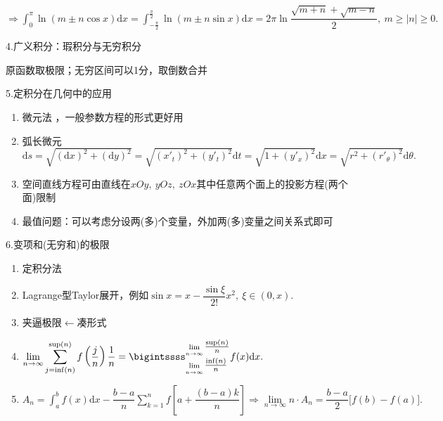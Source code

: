 \documentclass[UTF8]{ctexart}
\numberwithin{equation}{section}
\numberwithin{figure}{section}
\numberwithin{table}{section}
\newcommand\dif{\mathrm{d}}
\newcommand\no{\noindent}
\newcommand\dis{\displaystyle}
\newcommand\gs{\geqslant}
\newcommand\limn{\dis\lim\limits_{n\to\infty}}
\newcommand\intd{\dis\int}
\newcommand\intab{\dis\int_a^b}
\begin{document}
\begin{spacing}{2}
\begin{enumerate}[itemindent=1.4em, label=(\arabic*)]
\textcolor[rgb]{1,0,0}{$\Longrightarrow\intd_0^\pi\ln(m\pm n\cos x)\dif x
=\intd_{-\tfrac{\pi}{2}}^{\tfrac{\pi}{2}}\ln(m\pm n\sin x)\dif x
=2\pi\ln\dfrac{\sqrt{m+n}+\sqrt{m-n}}{2},\ m\gs |n|\gs 0.$}

\end{enumerate}

\no4.广义积分：瑕积分与无穷积分

原函数取极限；无穷区间可以1分，取倒数合并

\no5.定积分在几何中的应用

\begin{enumerate}[itemindent=1.4em, label=(\arabic*)]

\item  微元法 ，一般参数方程的形式更好用

\item 弧长微元$\dis\dif s=\sqrt{(\dif x)^2+(\dif y)^2}=\sqrt{(x'_t)^2+(y'_t)^2}\dif t
=\sqrt{1+(y'_x)^2}\dif x=\sqrt{r^2+(r'_\theta)^2}\dif \theta.$

\item 空间直线方程可由直线在$xOy,\ yOz,\ zOx$其中任意两个面上的投影方程(两个面)限制

\item 最值问题：可以考虑分设两(多)个变量，外加两(多)变量之间关系式即可

\end{enumerate}

\no6.变项和(无穷和)的极限

\begin{enumerate}[itemindent=1.4em, label=(\arabic*)]

\item 定积分法

\item Lagrange型Taylor展开，例如$\sin x=x-\dfrac{\sin\xi}{2!}x^2,\ \xi\in(0,x).$

\item 夹逼极限$\longleftarrow$凑形式

\item $\limn\sum\limits_{j=\inf(n)}^{\sup(n)}f\left(\dfrac{j}{n}\right)\dfrac{1}{n}=
\bigintssss_{\lim\limits_{n\to\infty}\tfrac{\inf(n)}{n}}
^{\lim\limits_{n\to\infty}\tfrac{\sup(n)}{n}}f(x)\dif x.$

\item $A_n=\intab f(x)\dif x-\dfrac{b-a}{n}\dis\sum\limits_{k=1}^nf\left[
a+\dfrac{(b-a)k}{n}\right]\Longrightarrow\limn n\cdot A_n=\dfrac{b-a}{2}
\big[f(b)-f(a)\big].$

\vspace{0.2cm}


\end{enumerate}
\end{spacing}
\end{document}
